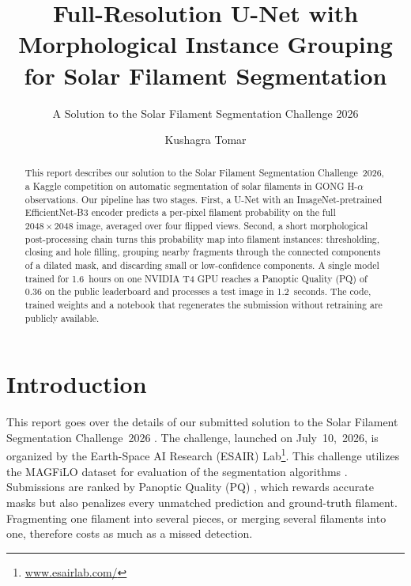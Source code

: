 \documentclass[sigconf]{acmart}
\begin{document}
\title{Full-Resolution U-Net with Morphological Instance Grouping for Solar Filament Segmentation}
\subtitle{A Solution to the Solar Filament Segmentation Challenge 2026} %


\author{Kushagra Tomar}

\begin{abstract}
    This report describes our solution to the Solar Filament Segmentation Challenge~2026, a Kaggle competition on automatic segmentation of solar filaments in GONG H-$\alpha$ observations. Our pipeline has two stages. First, a U-Net with an ImageNet-pretrained EfficientNet-B3 encoder predicts a per-pixel filament probability on the full $2048\times2048$ image, averaged over four flipped views. Second, a short morphological post-processing chain turns this probability map into filament instances: thresholding, closing and hole filling, grouping nearby fragments through the connected components of a dilated mask, and discarding small or low-confidence components. A single model trained for 1.6~hours on one NVIDIA T4 GPU reaches a Panoptic Quality (PQ) of 0.36 on the public leaderboard and processes a test image in 1.2~seconds. The code, trained weights and a notebook that regenerates the submission without retraining are publicly available.
\end{abstract}

\maketitle

\ifguideStyle
{}
\par\medskip
\fi


\section{Introduction}
    This report goes over the details of our submitted solution to the Solar Filament Segmentation Challenge~2026 \cite{filament-segmentation-2026}. The challenge, launched on July~10,~2026, is organized by the Earth-Space AI Research (ESAIR) Lab\footnote{\href{https://www.esairlab.com/home}{www.esairlab.com/}}. This challenge utilizes the MAGFiLO dataset for evaluation of the segmentation algorithms \cite{ahmadzadeh2024dataset}. Submissions are ranked by Panoptic Quality (PQ) \cite{kirillov2019panoptic}, which rewards accurate masks but also penalizes every unmatched prediction and ground-truth filament. Fragmenting one filament into several pieces, or merging several filaments into one, therefore costs as much as a missed detection.
\end{document}
